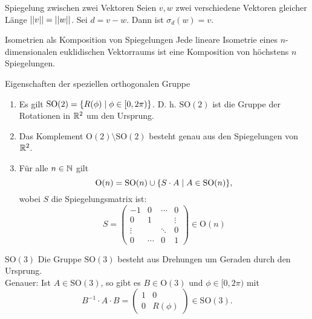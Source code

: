 \documentclass[main.tex]{subfiles}
\begin{document}
\begin{karte}{Spiegelung zwischen zwei Vektoren}
    Seien \(v,w\) zwei verschiedene Vektoren 
    gleicher Länge \( \left|\left|v\right|\right| = \left|\left|w\right|\right| \). Sei 
    \( d = v-w \). Dann ist \( \sigma_d(w) = v \).
\end{karte}

\begin{karte}{Isometrien als Komposition von Spiegelungen}
    Jede lineare Isometrie eines \(n\)-dimensionalen 
    euklidischen Vektorraums ist eine Komposition von 
    höchstens \(n\) Spiegelungen.
\end{karte}

\begin{karte}{Eigenschaften der speziellen orthogonalen Gruppe}
    \begin{enumerate}
        \item Es gilt \( \mathrm{SO}(2) = \{R(\phi) \;\vert\; 
        \phi \in [0,2\pi)\} \). D. h. \( \mathrm{SO}(2) \) ist 
        die Gruppe der Rotationen in \( \mathbb{R}^2 \) um den Ursprung.
        \item Das Komplement \( \mathrm{O}(2) \setminus 
        \mathrm{SO}(2) \) besteht genau aus den Spiegelungen 
        von \(\mathbb{R}^2\).
        \item Für alle \( n\in\mathbb{N} \) gilt 
        \[ \mathrm{O}(n) = \mathrm{SO}(n) \cup 
        \{S\cdot A \;\vert\; A \in \mathrm{SO}(n)\}, \] 
        wobei \(S\) die Spiegelungsmatrix ist: 
        \[ S = \begin{pmatrix}
            -1 & 0 &\cdots & 0 \\
            0 & 1 && \vdots \\
            \vdots && \ddots & 0 \\
            0 & \cdots & 0 & 1
        \end{pmatrix} \in \mathrm{O}(n) \]
    \end{enumerate}
\end{karte}

\begin{karte}{\( \mathrm{SO}(3) \)}
    Die Gruppe \( \mathrm{SO}(3) \) besteht aus 
    Drehungen um Geraden durch den Ursprung. \\
    Genauer: Ist \(A \in \mathrm{SO}(3)\), so gibt 
    es \( B\in \mathrm{O}(3) \) und 
    \( \phi \in [0,2\pi) \) mit 
    \[ B^{-1} \cdot A \cdot B = 
    \begin{pmatrix}
        1 & 0 \\ 0 & R(\phi)
    \end{pmatrix} \in \mathrm{SO}(3). \]
\end{karte}
\end{document}

